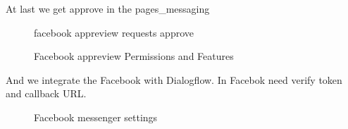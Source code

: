 \documentclass[12pt,oneside,openright,a4paper]{cpe-english-project}
\begin{document}
		\begin{flushleft}
			At last we get approve in the pages\_messaging
		\end{flushleft}
		\begin{figure}[!h]\centering
			\caption{facebook appreview requests approve}\label{fig:facebook appreview requests approve}
			\caption{Facebook appreview Permissions and Features}\label{fig:Facebook appreview Permissions and Features}
		\end{figure}
\pagebreak
		\begin{flushleft}
			And we integrate the Facebook with Dialogflow. In Facebok need verify token and callback URL.
		\end{flushleft}
		\begin{figure}[!h]\centering
			\caption{Facebook messenger settings}\label{fig:Facebook messenger settings}
		\end{figure}
\pagebreak
\end{document}
